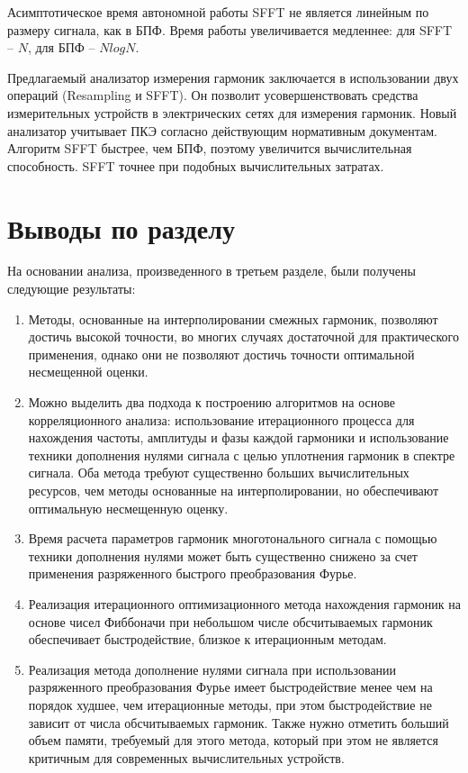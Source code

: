 
Асимптотическое время автономной работы SFFT не является линейным по размеру сигнала, как в БПФ. Время работы увеличивается медленнее: для SFFT – $N$, для БПФ – $NlogN$.

Предлагаемый анализатор измерения гармоник заключается в использовании двух операций (Resampling и SFFT). Он позволит усовершенствовать средства измерительных устройств в электрических сетях для измерения гармоник. Новый анализатор учитывает ПКЭ согласно действующим нормативным документам. Алгоритм SFFT быстрее, чем БПФ, поэтому увеличится вычислительная способность. SFFT точнее при 
подобных вычислительных затратах. 

\section{Выводы по разделу} \label{sec:ch3/sect8}
На основании анализа, произведенного в третьем разделе, были получены следующие результаты:

\begin{enumerate}
\item Методы, основанные на интерполировании смежных гармоник, позволяют достичь высокой точности, во многих случаях достаточной для практического применения, однако они не позволяют достичь точности оптимальной несмещенной оценки.

\item Можно выделить два подхода к построению алгоритмов на основе корреляционного анализа: использование итерационного процесса для нахождения частоты, амплитуды и фазы каждой гармоники и использование техники дополнения нулями сигнала с целью уплотнения гармоник в спектре сигнала. Оба метода требуют существенно больших вычислительных ресурсов, чем методы основанные на интерполировании, но обеспечивают оптимальную несмещенную оценку.

\item Время расчета параметров гармоник многотонального сигнала с помощью техники дополнения нулями может быть существенно снижено за счет применения разряженного быстрого преобразования Фурье.

\item Реализация итерационного оптимизационного метода нахождения гармоник на основе чисел Фиббоначи при небольшом числе обсчитываемых гармоник обеспечивает быстродействие, близкое к итерационным методам. 

\item Реализация метода дополнение нулями сигнала при использовании разряженного преобразования Фурье имеет быстродействие менее чем на порядок худшее, чем итерационные методы, при этом быстродействие не зависит от числа обсчитываемых гармоник. Также нужно отметить больший объем памяти, требуемый для этого метода, который при этом не является критичным для современных вычислительных устройств.
\end{enumerate}
